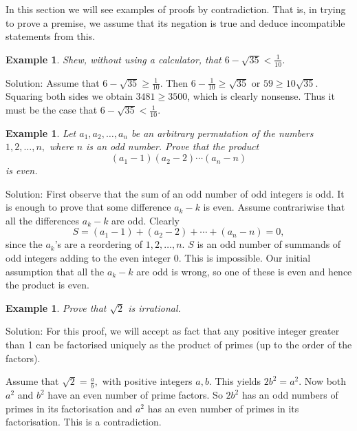 \documentclass[11pt, openany]{book}
\theoremstyle{change} \theoremheaderfont{\blue\sffamily\bfseries}
\newtheorem{exa}[thm]{Example}
\theoremstyle{nonumberplain} \theoremheaderfont{\sffamily\bfseries}
\newcommand{\dis}{\displaystyle}
\newcommand{\í}{\'{\i}}
\begin{document}
In this section we will see examples of proofs by contradiction.
That is, in trying to prove a premise, we assume that its negation
is true and deduce incompatible statements from this.

\begin{exa}
Shew, without using a calculator, that $\dis{6 - \sqrt{35} <
\frac{1}{10}}$.
\end{exa}
Solution: Assume that  $\dis{6 - \sqrt{35} \geq \frac{1}{10}}$.
Then $\dis{6 - \frac{1}{10} \geq \sqrt{35}}$ or $59 \geq
10\sqrt{35}$. Squaring both sides we obtain $3481 \geq 3500$,
which is clearly nonsense. Thus it must be the case that $\dis{6 -
\sqrt{35} < \frac{1}{10}}$.
\begin{exa}
Let $a_1, a_2, \ldots , a_n$ be an arbitrary permutation of the
numbers $1, 2, \ldots , n, $ where $n$ is an odd number. Prove
that the product
$$(a_1 - 1)(a_2 - 2)\cdots (a_n - n)$$ is even.
\end{exa}
Solution: First observe that the sum of an odd number of odd
integers is odd. It is enough to prove  that some difference $a_k
- k$ is even. Assume contrariwise that all the differences $a_k -
k$ are odd. Clearly
$$S = (a_1 - 1) + (a_2 - 2) + \cdots + (a_n - n) = 0,$$ since the $a_k$'s are a
reordering of $1, 2, \ldots , n$. $S$ is an odd  number of
summands of odd integers adding to the even integer 0. This is
impossible. Our initial assumption that all the $a_k - k$ are odd
is wrong, so one of these is even and hence the product is even.

\begin{exa}
Prove that $\sqrt{2}$ is irrational.
\end{exa}
Solution: For this proof, we will accept as fact that any positive
integer greater than 1 can be factorised uniquely as the product
of primes (up to the order of the factors).


Assume that $\dis{\sqrt{2} = \frac{a}{b}},$ with positive integers
$a, b$. This yields $2b^2 = a^2.$ Now both $a^2$ and $b^2$ have an
even number of prime factors. So $2b^2$ has an odd numbers of
primes in its factorisation and $a^2$ has an even number of primes
in its factorisation. This is a contradiction.
\end{document}
